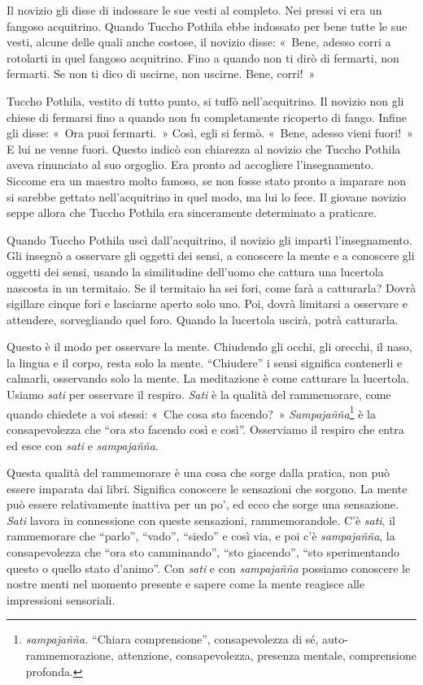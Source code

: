 Il novizio gli disse di indossare le sue vesti al completo. Nei pressi
vi era un fangoso acquitrino. Quando Tuccho Pothila ebbe indossato per
bene tutte le sue vesti, alcune delle quali anche costose, il novizio
disse: «~Bene, adesso corri a rotolarti in quel fangoso acquitrino. Fino
a quando non ti dirò di fermarti, non fermarti. Se non ti dico di
uscirne, non uscirne. Bene, corri!~»

Tuccho Pothila, vestito di tutto punto, si tuffò nell'acquitrino. Il
novizio non gli chiese di fermarsi fino a quando non fu completamente
ricoperto di fango. Infine gli disse: «~Ora puoi fermarti.~» Così, egli
si fermò. «~Bene, adesso vieni fuori!~» E lui ne venne fuori. Questo
indicò con chiarezza al novizio che Tuccho Pothila aveva rinunciato al
suo orgoglio. Era pronto ad accogliere l'insegnamento. Siccome era un
maestro molto famoso, se non fosse stato pronto a imparare non si
sarebbe gettato nell'acquitrino in quel modo, ma lui lo fece. Il giovane
novizio seppe allora che Tuccho Pothila era sinceramente determinato a
praticare.

Quando Tuccho Pothila uscì dall'acquitrino, il novizio gli impartì
l'insegnamento. Gli insegnò a osservare gli oggetti dei sensi, a
conoscere la mente e a conoscere gli oggetti dei sensi, usando la
similitudine dell'uomo che cattura una lucertola nascosta in un
termitaio. Se il termitaio ha sei fori, come farà a catturarla? Dovrà
sigillare cinque fori e lasciarne aperto solo uno. Poi, dovrà limitarsi
a osservare e attendere, sorvegliando quel foro. Quando la lucertola
uscirà, potrà catturarla.

Questo è il modo per osservare la mente. Chiudendo gli occhi, gli
orecchi, il naso, la lingua e il corpo, resta solo la mente.
``Chiudere'' i sensi significa contenerli e calmarli, osservando solo la
mente. La meditazione è come catturare la lucertola. Usiamo \emph{sati}
per osservare il respiro. \emph{Sati} è la qualità del rammemorare, come
quando chiedete a voi stessi: «~Che cosa sto facendo?~»
\emph{Sampajañña}\footnote{\emph{sampajañña.} ``Chiara comprensione'',
  consapevolezza di sé, auto-rammemorazione, attenzione, consapevolezza,
  presenza mentale, comprensione profonda.} è la consapevolezza che
``ora sto facendo così e così''. Osserviamo il respiro che entra ed esce
con \emph{sati} e \emph{sampajañña}.

Questa qualità del rammemorare è una cosa che sorge dalla pratica, non
può essere imparata dai libri. Significa conoscere le sensazioni che
sorgono. La mente può essere relativamente inattiva per un po', ed ecco
che sorge una sensazione. \emph{Sati} lavora in connessione con queste
sensazioni, rammemorandole. C'è \emph{sati}, il rammemorare che
``parlo'', ``vado'', ``siedo'' e così via, e poi c'è \emph{sampajañña},
la consapevolezza che ``ora sto camminando'', ``sto giacendo'', ``sto
sperimentando questo o quello stato d'animo''. Con \emph{sati} e con
\emph{sampajañña} possiamo conoscere le nostre menti nel momento
presente e sapere come la mente reagisce alle impressioni sensoriali.

